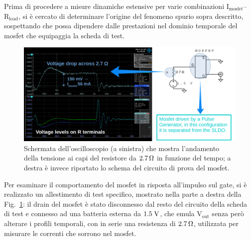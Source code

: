 Prima di procedere a misure dinamiche estensive per varie combinazioni $\mathrm{I_{mosfet}}$--$\mathrm{R_{load}}$, si è cercato di determinare l'origine del fenomeno spurio sopra descritto, sospettando che possa dipendere dalle prestazioni nel dominio temporale del mosfet che equipaggia la scheda di test.


\begin{figure}
\centering
\includegraphics[width=\linewidth]{Immagini/MosfetBehaviourbis}
\caption{Schermata dell'oscilloscopio (a sinistra) che mostra l'andamento della tensione ai capi del resistore da $2.7{\rm \, \Omega}$ in funzione del tempo; a destra è invece riportato lo schema del circuito di prova del mosfet.}
\label{MosfetBehaviour}
\end{figure}

Per esaminare il comportamento del mosfet in risposta all'impulso sul gate, si è realizzato un allestimento di test specifico, mostrato nella parte a destra della Fig.~\ref{MosfetBehaviour}: il drain del mosfet è stato disconnesso dal resto del circuito della scheda di test e connesso ad una batteria esterna da $1.5\rm \; V$, che emula $\mathrm{V_{out}}$ senza per\`o alterare i profili temporali, con in serie una resistenza di $2.7{\rm \, \Omega}$, utilizzata per misurare le correnti che sorrono nel mosfet. 

